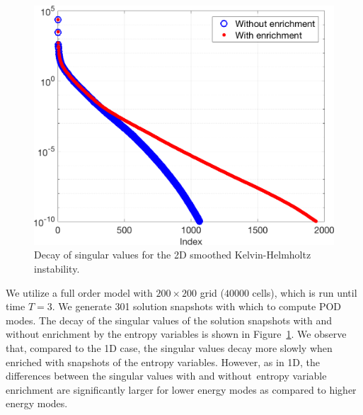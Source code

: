 \documentclass[preprint,10pt]{elsarticle}
\theoremstyle{definition}
\theoremstyle{lemma}
\theoremstyle{theorem}
\theoremstyle{assumption}
\begin{document}
\begin{figure}
\centering
\includegraphics[width=.4\textwidth]{figs/khsvd.png}
\caption{Decay of singular values for the 2D smoothed Kelvin-Helmholtz instability.}
\label{fig:khsvd}
\end{figure}
We utilize a full order model with $200\times 200$ grid ($40000$ cells), which is run until time $T = 3$.  We generate 301 solution snapshots with which to compute POD modes.  The decay of the singular values of the solution snapshots with and without enrichment by the entropy variables is shown in Figure~\ref{fig:khsvd}.  We observe that, compared to the 1D case, the singular values decay more slowly when enriched with snapshots of the entropy variables.  However, as in 1D, the differences between the singular values with and without entropy variable enrichment are significantly larger for lower energy modes as compared to higher energy modes.  
\end{document}

